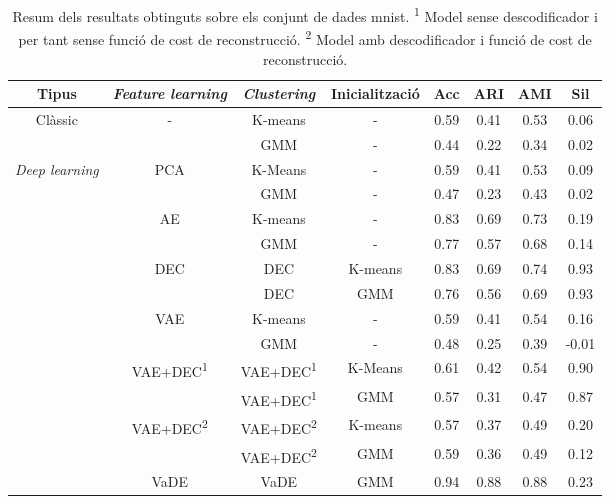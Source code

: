 \documentclass[CAT,BIB]{TFUOC}%
\begin{document}
    \begin{table}[p]
        \small
        \centering
        \begin{minipage}{\textwidth}

        \begin{tabular}{@{}cccccccc@{}}
            \toprule
            \textbf{Tipus} & \textbf{\textit{Feature learning}} & \textbf{\textit{Clustering}} & \textbf{Inicialització} & \textbf{Acc} & \textbf{ARI} & \textbf{AMI} & \textbf{Sil} \\ \midrule
            \multirow{2}{*}{Clàssic} & \multirow{2}{*}{-} & K-means & - & 0.59 & 0.41 & 0.53 & 0.06 \\
            &  & GMM & - & 0.44 & 0.22 & 0.34 & 0.02 \\
            \multirow{13}{*}{\textit{Deep learning}} & \multirow{2}{*}{PCA} & K-Means & - & 0.59 & 0.41 & 0.53 & 0.09 \\
            &  & GMM & - & 0.47 & 0.23 & 0.43 & 0.02 \\  \midrule
            & \multirow{2}{*}{AE} & K-means & - & 0.83 & 0.69 & 0.73 & 0.19 \\
            &  & GMM & - & 0.77 & 0.57 & 0.68 & 0.14 \\
            & \multirow{2}{*}{DEC} & DEC & K-means & 0.83 & 0.69 & 0.74 & 0.93 \\
            &  & DEC & GMM & 0.76 & 0.56 & 0.69 & 0.93 \\
            & \multirow{2}{*}{VAE} & K-means & - & 0.59 & 0.41 & 0.54 & 0.16 \\
            &  & GMM & - & 0.48 & 0.25 & 0.39 & -0.01 \\
            & \multirow{2}{*}{VAE+DEC\textsuperscript{1}} & VAE+DEC\textsuperscript{1} & K-Means & 0.61 & 0.42 & 0.54 & 0.90 \\
            &  & VAE+DEC\textsuperscript{1} & GMM & 0.57 & 0.31 & 0.47 & 0.87 \\
            & \multirow{2}{*}{VAE+DEC\textsuperscript{2}} & VAE+DEC\textsuperscript{2} & K-means & 0.57 & 0.37 & 0.49 & 0.20 \\
            &  & VAE+DEC\textsuperscript{2} & GMM & 0.59 & 0.36 & 0.49 & 0.12 \\
            & VaDE & VaDE & GMM & 0.94 & 0.88 & 0.88 & 0.23 \\ \bottomrule
        \end{tabular}
        \caption[MNIST: resultats]{Resum dels resultats obtinguts sobre els conjunt de dades \gls{mnist}.
            \newline \textsuperscript{1} Model sense descodificador i per tant sense funció de cost de reconstrucció.
            \newline \textsuperscript{2} Model amb descodificador i funció de cost de reconstrucció.
        }
        \label{t:results_mnist}
        \end{minipage}
    \end{table}
\end{document}
